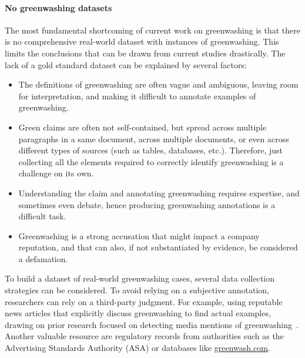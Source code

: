 \paragraph{No greenwashing datasets} The most fundamental shortcoming of current work on greenwashing is that there is no comprehensive real-world dataset with instances of greenwashing. This limits the conclusions that can be drawn from current studies drastically. The lack of a gold standard dataset can be explained by several factors: 
\begin{itemize}
    \item The definitions of greenwashing are often vague and ambiguous, leaving room for interpretation, and making it difficult to annotate examples of greenwashing.
    \item Green claims are often not self-contained, but spread %
    across multiple paragraphs in a same document, across multiple documents, or even across different types of sources (such as tables, databases, etc.). Therefore, just collecting all the elements required to correctly identify greenwashing is a challenge on its own.
    \item Understanding the claim and annotating greenwashing requires expertise, and sometimes even debate, hence producing greenwashing annotations is a difficult task.
    \item Greenwashing is a strong accusation that might impact a company reputation, and that can also, if not substantiated by evidence, be considered a defamation.
\end{itemize}

To build a dataset of real-world greenwashing cases, several data collection strategies can be considered. To avoid relying on a subjective annotation, researchers can rely on a third-party judgment. For example, using reputable news articles that explicitly discuss greenwashing to find actual examples, drawing on prior research focused on detecting media mentions of greenwashing~\cite{gourierGreenwashingIndex2024}. Another valuable resource are regulatory records from authorities such as the Advertising Standards Authority (ASA) or databases like \url{greenwash.com}.


